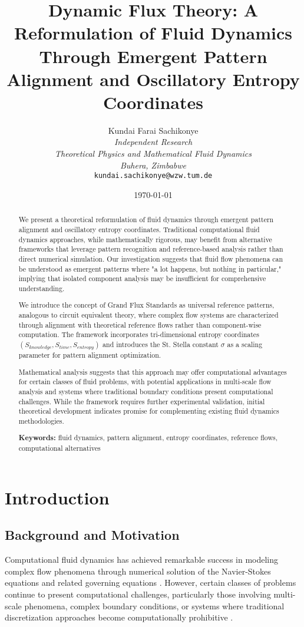 \documentclass[12pt,a4paper]{article}
\title{\textbf{Dynamic Flux Theory: A Reformulation of Fluid Dynamics Through Emergent Pattern Alignment and Oscillatory Entropy Coordinates}}
\author{
Kundai Farai Sachikonye\\
\textit{Independent Research}\\
\textit{Theoretical Physics and Mathematical Fluid Dynamics}\\
\textit{Buhera, Zimbabwe}\\
\texttt{kundai.sachikonye@wzw.tum.de}
}
\date{\today}
\begin{document}
\maketitle

\begin{abstract}
We present a theoretical reformulation of fluid dynamics through emergent pattern alignment and oscillatory entropy coordinates. Traditional computational fluid dynamics approaches, while mathematically rigorous, may benefit from alternative frameworks that leverage pattern recognition and reference-based analysis rather than direct numerical simulation. Our investigation suggests that fluid flow phenomena can be understood as emergent patterns where "a lot happens, but nothing in particular," implying that isolated component analysis may be insufficient for comprehensive understanding.

We introduce the concept of Grand Flux Standards as universal reference patterns, analogous to circuit equivalent theory, where complex flow systems are characterized through alignment with theoretical reference flows rather than component-wise computation. The framework incorporates tri-dimensional entropy coordinates $(S_{knowledge}, S_{time}, S_{entropy})$ and introduces the St. Stella constant $\sigma$ as a scaling parameter for pattern alignment optimization.

Mathematical analysis suggests that this approach may offer computational advantages for certain classes of fluid problems, with potential applications in multi-scale flow analysis and systems where traditional boundary conditions present computational challenges. While the framework requires further experimental validation, initial theoretical development indicates promise for complementing existing fluid dynamics methodologies.

\textbf{Keywords:} fluid dynamics, pattern alignment, entropy coordinates, reference flows, computational alternatives
\end{abstract}

\section{Introduction}

\subsection{Background and Motivation}

Computational fluid dynamics has achieved remarkable success in modeling complex flow phenomena through numerical solution of the Navier-Stokes equations and related governing equations \cite{anderson1995computational}. However, certain classes of problems continue to present computational challenges, particularly those involving multi-scale phenomena, complex boundary conditions, or systems where traditional discretization approaches become computationally prohibitive \cite{pope2000turbulent}.
\end{document}
